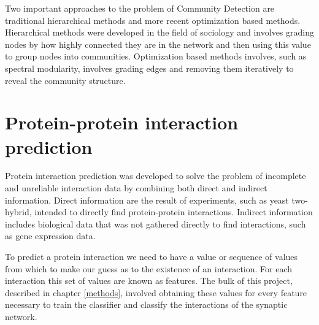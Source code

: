 Two important approaches to the problem of Community Detection are traditional hierarchical methods and more recent optimization based methods\autocite{newman_communities_2012}.
Hierarchical methods were developed in the field of sociology and involves grading nodes by how highly connected they are in the network and then using this value to group nodes into communities.
Optimization based methods involves, such as spectral modularity, involves grading edges and removing them iteratively to reveal the community structure.


\section{Protein-protein interaction prediction}

Protein interaction prediction was developed to solve the problem of incomplete and unreliable interaction data by combining both direct and indirect information\autocite{qi_learning_2008}.
Direct information are the result of experiments, such as yeast two-hybrid, intended to directly find protein-protein interactions.  %
Indirect information includes biological data that was not gathered directly to find interactions, such as gene expression data. %

To predict a protein interaction we need to have a value or sequence of values from which to make our guess as to the existence of an interaction.
For each interaction this set of values are known as features.
The bulk of this project, described in chapter \ref{methods}, involved obtaining these values for every feature necessary to train the classifier and classify the interactions of the synaptic network.  %

